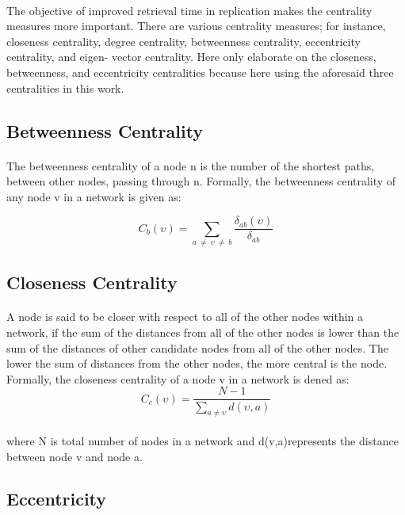 \paragraph{}
The objective of improved retrieval time in replication makes the centrality measures
more important. There are various centrality measures; for instance, closeness centrality,
degree centrality, betweenness centrality, eccentricity centrality, and eigen- vector centrality.
Here only elaborate on the closeness, betweenness, and eccentricity centralities because here
using the aforesaid three centralities in this work.
\subsection{Betweenness Centrality} 
\paragraph{}
The betweenness centrality of a node n is the number of the shortest paths, between
other nodes, passing through n. Formally, the betweenness centrality of any node v in a
network is given as:

\[
C_{b}(\upsilon) = \sum_{ a \ \neq \  \upsilon \ \neq \ b} \frac{\delta_{ab}(\upsilon)}{\delta_{ab}}
\] 

\subsection{Closeness Centrality}
\paragraph{}
A node is said to be closer with respect to all of the other nodes within a network, if
the sum of the distances from all of the other nodes is lower than the sum of the distances
of other candidate nodes from all of the other nodes. The lower the sum of distances from
the other nodes, the more central is the node. Formally, the closeness centrality of a node
v in a network is dened as:
\linebreak
\[
C_{c}(\upsilon) = \frac{N - 1}{ \sum _{ a \neq \upsilon} d(\upsilon, a)}
\]

\paragraph{}
where N is total number of nodes in a network and d(v,a)represents the distance between
node v and node a.
\subsection{Eccentricity}
